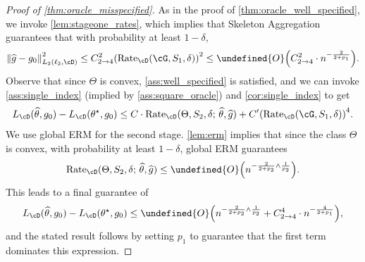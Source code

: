 \documentclass[11pt]{article} %
\newcommand{\journal}[1]{\iftoggle{journal}{#1}{}}
\newcommand{\preprint}[1]{\iftoggle{journal}{}{#1}}
\newcommand{\pref}[1]{\cref{#1}}
\newcommand{\pfref}[1]{Proof of \pref{#1}}
\theoremstyle{theorem}  %
\theoremstyle{plain}
\DeclarePairedDelimiter{\prn}{(}{)}
\DeclarePairedDelimiter{\nrm}{\|}{\|}
\newcommand{\ls}{\ell}
\newcommand{\wt}[1]{\widetilde{#1}}
\newcommand{\wh}[1]{\widehat{#1}}
\let\wt\undefined
\newcommand{\wt}[1]{\widetilde{#1}}
\newcommand{\Ot}{\wt{O}}
\newcommand{\midsem}{;\,}
\newcommand{\poprisk}{L_{\cD}}
\newcommand{\estone}{\wh{g}}
\newcommand{\esttwo}{\wh{\theta}}
\newcommand{\pone}{p_1}
\newcommand{\ptwo}{p_2}
\newcommand{\nuisance}{\cG}
\newcommand{\target}{\Theta}
\newcommand{\Rate}{\mathrm{Rate}_{\cD}}
\newcommand{\besttwo}{\theta^{\star}}
\newcommand{\gtone}{g_0}
\newcommand{\sampleone}{S_1}
\newcommand{\sampletwo}{S_2}
\newcommand{\momentconstant}{C_{2\to{}4}}
\newcommand{\footnoteorhide}[1]{\preprint{\footnote{#1}}\journal{}}
\begin{document}
\begin{proof}[\pfref{thm:oracle_misspecified}]
As in the proof of \pref{thm:oracle_well_specified}, we invoke \pref{lem:stageone_rates}, which implies that Skeleton Aggregation\footnoteorhide{Alternatively, global ERM can be applied when $\pone\leq{}2$.} guarantees that with probability at least $1-\delta$,
\[
 \nrm*{\estone-\gtone}_{L_{2}(\ls_2,\cD)}^{2}\leq \momentconstant^{2}\prn*{\Rate(\nuisance,\sampleone,\delta) }^{2}
\leq{} \Ot\prn*{\momentconstant^{2}\cdot
n^{-\frac{2}{2+\pone}}
}.
\]
\journal{We remark in passing that global ERM can also be applied when $\pone\leq{}2$.} Observe that since $\target$ is convex, \pref{ass:well_specified} is
satisfied, and we can invoke \pref{ass:single_index} (implied by
\pref{ass:square_oracle}) and \pref{cor:single_index} to get
\[
\poprisk(\esttwo,\gtone) - \poprisk(\besttwo,\gtone) \leq
C\cdot\Rate(\target,\sampletwo,\delta\midsem{}\esttwo,\estone)
+ C'\prn*{\Rate(\nuisance,\sampleone,\delta)}^{4}.
\]
We use global ERM for the second stage. \pref{lem:erm} implies that since the class $\target$ is convex, with probability at least $1-\delta$, global ERM guarantees
\[
\Rate(\target,\sampletwo,\delta\midsem{}\esttwo,\estone)
\leq{} \Ot\prn*{n^{-\frac{2}{2+\ptwo}\wedge\frac{1}{\ptwo}}}.
\]
This leads to a final guarantee of
\[
\poprisk(\esttwo,\gtone) - \poprisk(\besttwo,\gtone) \leq \Ot\prn*{
n^{-\frac{2}{2+\ptwo}\wedge\frac{1}{\ptwo}} + \momentconstant^{4}\cdot{}n^{-\frac{4}{2+\pone}}
},
\]
and the stated result follows by setting $\pone$ to guarantee that the first term dominates this expression.

\end{proof}
\end{document}

